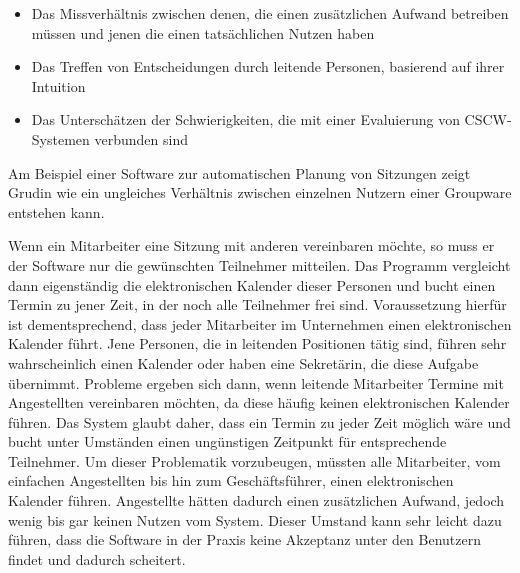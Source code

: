 \begin{itemize}
	\item
	Das Missverhältnis zwischen denen, die einen zusätzlichen Aufwand betreiben müssen und jenen die einen tatsächlichen Nutzen haben
	\item
	Das Treffen von Entscheidungen durch leitende Personen, basierend auf ihrer Intuition
	\item
	Das Unterschätzen der Schwierigkeiten, die mit einer Evaluierung von CSCW-Systemen verbunden sind
\end{itemize}

Am Beispiel einer Software zur automatischen Planung von Sitzungen zeigt Grudin wie ein ungleiches Verhältnis zwischen einzelnen Nutzern einer Groupware entstehen kann. 

Wenn ein Mitarbeiter eine Sitzung mit anderen vereinbaren möchte, so muss er der Software nur die gewünschten Teilnehmer mitteilen. Das Programm vergleicht dann eigenständig die elektronischen Kalender dieser Personen und bucht einen Termin zu jener Zeit, in der noch alle Teilnehmer frei sind. Voraussetzung hierfür ist dementsprechend, dass jeder Mitarbeiter im Unternehmen einen elektronischen Kalender führt. Jene Personen, die in leitenden Positionen tätig sind, führen sehr wahrscheinlich einen Kalender oder haben eine Sekretärin, die diese Aufgabe übernimmt. Probleme ergeben sich dann, wenn leitende Mitarbeiter Termine mit Angestellten vereinbaren möchten, da diese häufig keinen elektronischen Kalender führen. Das System glaubt daher, dass ein Termin zu jeder Zeit möglich wäre und bucht unter Umständen einen ungünstigen Zeitpunkt für entsprechende Teilnehmer.  Um dieser Problematik vorzubeugen, müssten alle Mitarbeiter, vom einfachen Angestellten bis hin zum Geschäftsführer, einen elektronischen Kalender führen. Angestellte hätten dadurch einen zusätzlichen Aufwand, jedoch wenig bis gar keinen Nutzen vom System. Dieser Umstand kann sehr leicht dazu führen, dass die Software in der Praxis keine Akzeptanz unter den Benutzern findet und dadurch scheitert.

